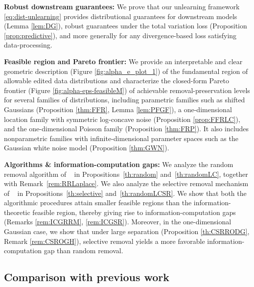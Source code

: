 \textbf{Robust downstream guarantees:} We prove that our unlearning framework  \eqref{eq:dist-unlearning} provides distributional guarantees for downstream models (Lemma \ref{lem:DG}),  robust guarantees under the total variation loss  (Proposition \ref{prop:predictive}), and more generally for any divergence-based loss satisfying data-processing.



\textbf{Feasible region and Pareto frontier:}  We provide an interpretable and  clear geometric description (Figure \ref{fig:alpha_e_plot_1}) of the fundamental region of allowable edited data distributions and characterize the closed-form Pareto frontier (Figure \ref{fig:alpha-eps-feasibleM}) of achievable removal-preservation levels for several families of distributions, including parametric families such as shifted Gaussians (Proposition \ref{thm:FFR}, Lemma \ref{lem:PFGF}), a one-dimensional location family with symmetric log-concave noise (Proposition \ref{prop:FFRLC}), and the one-dimensional Poisson family (Proposition \ref{thm:FRP}). It also includes nonparametric families with infinite-dimensional parameter spaces such as the Gaussian white noise model (Proposition \ref{thm:GWN}).
  


\textbf{Algorithms \& information-computation gaps:} We analyze the random removal algorithm of ~\citet{allouah2025distributionalmachineunlearningselective} in Propositions~\ref{th:random} and~\ref{th:randomLC}, together with Remark~\ref{rem:RRLaplace}. We also analyze the selective removal mechanism of ~\citet{allouah2025distributionalmachineunlearningselective} in Propositions~\ref{th:selective} and~\ref{th:randomLCSR}. We show that both the algorithmic procedures attain smaller feasible regions than the information-theoretic feasible region, thereby giving rise to information-computation gaps (Remarks \ref{rem:ICGRRM}, \ref{rem:ICGSR}). Moreover, in the one-dimensional Gaussian case, we show that under large separation (Proposition \ref{th:CSRRODG}, Remark \ref{rem:CSROGH}), selective removal yields a more favorable information-computation gap than random removal.
  


\vspace{-4mm}
\subsection{Comparison with previous work}
\label{ssec:Comparison}
\vspace{-2mm}



